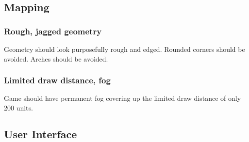 \documentclass[10pt,a4paper]{article}
\begin{document}
\subsection{Mapping}
\subsubsection{Rough, jagged geometry}
Geometry should look purposefully rough and edged. Rounded corners should be avoided. Arches should be avoided.
\subsubsection{Limited draw distance, fog}
Game should have permanent fog covering up the limited draw distance of only 200 units. 
\subsection{User Interface}
\end{document}
